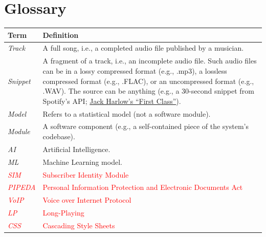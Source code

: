 \documentclass[12pt]{article}
\begin{document}
\section*{Glossary}
\begin{table}[H] %
  \centering
  \label{tab:glossary}
  \begin{tabular}{p{3cm} p{10cm}}
  \hline
  \textbf{Term} & \textbf{Definition} \\
  \hline
  \textit{Track} &
  A full song, i.e., a completed audio file published by a musician. \\[6pt]
  
  \textit{Snippet} &
  A fragment of a track, i.e., an incomplete audio file. Such audio files can be in a lossy compressed format (e.g., .mp3), 
  a lossless compressed format (e.g., .FLAC), or an uncompressed format (e.g., .WAV). The source can be anything 
  (e.g., a 30-second snippet from Spotify’s API; \href{https://p.scdn.co/mp3-preview/c05a687254dbdf50a9ab4879d85e54a7594e367f?cid=945b9ed74f4c43b49bcf26e7dc388df0}{Jack Harlow's ``First Class''}). \\[6pt]
  
  \textit{Model} &
  Refers to a statistical model (not a software module). \\[6pt]
  
  \textit{Module} &
  A software component (e.g., a self-contained piece of the system’s codebase). \\[6pt]
  
  \textit{AI} &
  Artificial Intelligence. \\[6pt]
  
  \textit{ML} &
  Machine Learning model. \\[6pt]

  \textcolor{red}{\textit{SIM}} &
  \textcolor{red}{Subscriber Identity Module} \\[6pt]

  \textcolor{red}{\textit{PIPEDA }} &
  \textcolor{red}{Personal Information Protection and Electronic Documents Act} \\[6pt]

  \textcolor{red}{\textit{VoIP}} &
  \textcolor{red}{Voice over Internet Protocol} \\[6pt]

  \textcolor{red}{\textit{LP}} &
  \textcolor{red}{Long-Playing} \\[6pt]

  \textcolor{red}{\textit{CSS}} &
  \textcolor{red}{Cascading Style Sheets} \\[6pt]


\end{tabular}
\end{table}
\end{document}
